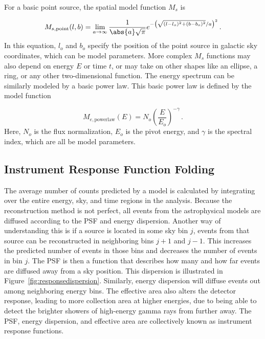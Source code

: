 For a basic point source, the spatial model function $M_s$ is

\begin{equation}\label{eqn:pntsrc_Ms}
  M_{s,\textrm{point}}(l,b) = \lim_{a\to\infty} \frac{1}{ \abs{a} \sqrt{\pi} } e^{ - \left ( \sqrt{ (l-l_o)^2 + (b-b_o)^2 }/a \right )^2 } \,.
\end{equation}
In this equation, $l_o$ and $b_o$ specify the position of the point source in galactic sky coordinates, which can be model parameters.
More complex $M_s$ functions may also depend on energy $E$ or time $t$, or may take on other shapes like an ellipse, a ring, or any other two-dimensional function.
The energy spectrum can be similarly modeled by a basic power law.
This basic power law is defined by the model function

\begin{equation}\label{eqn:powerlaw_Me}
  M_{e,\textrm{powerlaw}}(E) = N_o \left ( \frac{E}{E_o} \right )^{-\gamma} \,.
\end{equation}
Here, $N_o$ is the flux normalization, $E_o$ is the pivot energy, and $\gamma$ is the spectral index, which are all be model parameters.


\subsection{Instrument Response Function Folding}\label{subsec:folding}
The average number of counts predicted by a model is calculated by integrating over the entire energy, sky, and time regions in the analysis.
Because the reconstruction method is not perfect, all events from the astrophysical models are diffused according to the PSF and energy dispersion.
Another way of understanding this is if a source is located in some sky bin $j$, events from that source can be reconstructed in neighboring bins $j+1$ and $j-1$.
This increases the predicted number of events in those bins and decreases the number of events in bin $j$.
The PSF is then a function that describes how many and how far events are diffused away from a sky position.
This dispersion is illustrated in Figure~\ref{fig:responsedispersion}.
Similarly, energy dispersion will diffuse events out among neighboring energy bins.
The effective area also alters the detector response, leading to more collection area at higher energies, due to being able to detect the brighter showers of high-energy gamma rays from further away.
The PSF, energy dispersion, and effective area are collectively known as instrument response functions.

